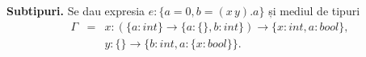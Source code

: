 \documentclass[addpoints,12pt,a4paper,answers]{exam}
\begin{document}
\begin{questions}


\question[2] \textbf{Subtipuri. }
Se dau expresia $e: \{a=0, b=(x\, y).a\}$ și mediul de tipuri
\[\begin{array}{lcl}\Gamma&=& x: (\{a: \textit{int}\} \rightarrow \{a:\{\}, b:\textit{int}\})\rightarrow \{x:\textit{int}, a: \textit{bool}\},\\ && y: \{\} \rightarrow \{b: \textit{int}, a:\{x: \textit{bool}\}\}.\end{array}\]


\end{questions}


\end{document}
